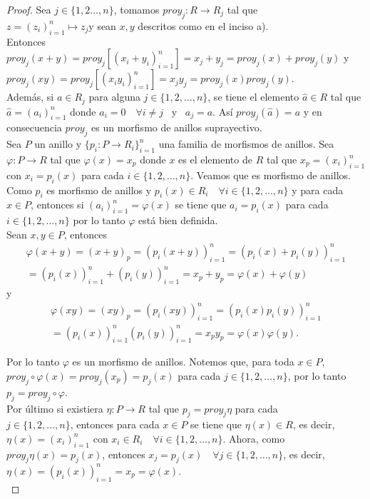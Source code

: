 \documentclass{article}
\begin{document}
\begin{enumerate}[label=\textbf{Ej \arabic*.}]
\begin{proof}
			 Sea $j\in \{1,2\ldots,n\}$, tomamos $proy_j:R\to R_j$ tal que \\
			$z=(z_i)_{i=1}^n\mapsto z_j$\quad y sean $x,y$ descritos como en el inciso a).\\
			
			Entonces $proy_j(x+y)=proy_j[(x_i+y_i)_{i=1}^n] =x_j+y_j=proy_j(x)+proy_j(y)$ y 
			$proy_j(xy)=proy_j[(x_iy_i)_{i=1}^n] =x_jy_j=proy_j(x)proy_j(y)$.\\
			
			Además, si $a\in R_j$ para alguna $j\in \{1,2,\ldots,n\}$, 
			se tiene el elemento $\hat{a}\in R$ tal que $\hat{a}=(a_i)_{i=1}^n$ donde $a_i=0\quad \forall i\neq j$ \, y \, $a_j=a$.
			Así $proy_j(\hat{a})=a$ y en consecuencia $proy_j$ es un morfismo de anillos suprayectivo.\\
			
			 Sea $P$ un anillo y $\{p_i:P\to R_i\}_{i=1}^n$ una familia de morfismos de anillos. Sea $\varphi:P\to R$ tal que $\varphi(x)=x_p$ donde 
			$x$ es el elemento de $R$ tal que $x_p=(x_i)^n_{i=1}$ con $x_i=p_i(x)$ para cada $i\in \{1,2,\ldots,n\}$. Veamos que es morfismo de anillos.\\
			
			Como $p_i$ es morfismo de anillos y $p_i(x)\in R_i\quad \forall i\in \{1,2,\ldots,n\}$ y para cada $x\in P$, 
			entonces si $(a_i)_{i=1}^n=\varphi(x)$ se tiene que 
			$a_i=p_i(x)$ para cada $i\in \{1,2,\ldots,n\}$ por lo tanto $\varphi$ está bien definida.\\
			
			Sean $x,y\in P$, entonces 
			\begin{gather*}
				\varphi(x+y)=(x+y)_p=(p_i(x+y))_{i=1}^n=(p_i(x)+p_i(y))_{i=1}^n\\
				=(p_i(x))_{i=1}^n+(p_i(y))_{i=1}^n=x_p+y_p=\varphi(x)+\varphi(y)
			\end{gather*}
			y
			\begin{gather*}
				\varphi(xy)=(xy)_p=(p_i(xy))_{i=1}^n=(p_i(x)p_i(y))_{i=1}^n\\
				=(p_i(x))_{i=1}^n(p_i(y))_{i=1}^n=x_py_p=\varphi(x)\varphi(y).
			\end{gather*}
			
			Por lo tanto $\varphi$ es un morfismo de anillos.
			Notemos que, para toda $x\in P$, $proy_j\circ \varphi(x)=proy_j(x_p)=p_j(x)$ para cada $j\in \{1,2,\ldots,n\}$, por lo tanto $p_j=proy_j\circ \varphi$.\\
			
			Por último si existiera $\eta:P\to R$ tal que $p_j=proy_j\eta$ para cada \\$j\in \{1,2,\ldots,n\}$, entonces para cada $x\in P$ se tiene que 
			$\eta(x)\in R$, es decir, $\eta(x)=(x_i)_{i=1}^n$ con $x_i\in R_i\quad \forall i\in \{1,2,\ldots,n\}$.
			Ahora, como\\ $proy_j\eta(x)=p_j(x)$, entonces $x_j=p_j(x)\quad \forall j\in \{1,2,\ldots,n\}$, es decir, $\eta(x)=(p_i(x))_{i=1}^n=x_p=\varphi(x).$\\
			

\end{proof}
\end{enumerate}
\end{document}
